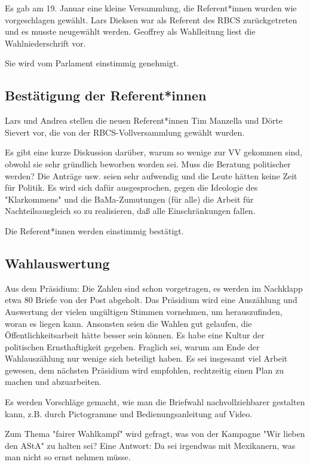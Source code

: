 \documentclass[ngerman,headheight=70pt]{scrartcl}
\begin{document}
    Es gab am 19. Januar eine kleine Versammlung, die Referent*innen wurden wie
    vorgeschlagen gewählt. Lars Dieksen war als Referent des RBCS zurückgetreten
    und es musste neugewählt werden. Geoffrey als Wahlleitung liest die
    Wahlniederschrift vor.

    Sie wird vom Parlament einstimmig genehmigt.

    \subsection{Bestätigung der Referent*innen}

    Lars und Andrea stellen die neuen Referent*innen Tim Manzella und Dörte
    Sievert vor, die von der RBCS-Vollversammlung gewählt wurden.

    Es gibt eine kurze Diskussion darüber, warum so wenige zur VV gekommen sind,
    obwohl sie sehr gründlich beworben worden sei. Muss die Beratung politischer
    werden? Die Anträge usw. seien sehr aufwendig und die Leute hätten keine Zeit
    für Politik. Es wird sich dafür ausgesprochen, gegen die Ideologie des
    "Klarkommens" und die BaMa-Zumutungen (für alle) die Arbeit für
    Nachteilsausgleich so zu realisieren, daß alle Einschränkungen fallen.

    Die Referent*innen werden einstimmig bestätigt.

    \subsection{Wahlauswertung}

    Aus dem Präsidium: Die Zahlen sind schon vorgetragen, es werden im Nachklapp
    etwa 80 Briefe von der Post abgeholt. Das Präsidium wird eine Auszählung und
    Auswertung der vielen ungültigen Stimmen vornehmen, um herauszufinden, woran
    es liegen kann. Ansonsten seien die Wahlen gut gelaufen, die
    Öffentlichkeitsarbeit hätte besser sein können. Es habe eine Kultur der politischen
    Ernsthaftigkeit gegeben. Fraglich sei, warum am Ende der Wahlauszählung nur
    wenige sich beteiligt haben. Es sei insgesamt viel Arbeit gewesen, dem
    nächsten Präsidium wird empfohlen, rechtzeitig einen Plan zu machen und
    abzuarbeiten.

    Es werden Vorschläge gemacht, wie man die Briefwahl nachvollziehbarer
    gestalten kann, z.B. durch Pictogramme und Bedienungsanleitung auf Video.

    Zum Thema "fairer Wahlkampf" wird gefragt, was von der Kampagne "Wir lieben
    den AStA" zu halten sei? Eine Antwort: Da sei irgendwas mit Mexikanern, was
    man nicht so ernst nehmen müsse.
\end{document}
